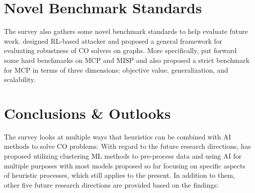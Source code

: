 \documentclass[a4paper]{article}
\begin{document}
\section{Novel Benchmark Standards}
The survey also gathers some novel benchmark standards to help evaluate future work. \citet{Lu} designed RL-based attacker and proposed a general framework for evaluating robustness of CO solvers on graphs. More specifically, \citet{Angelini} put forward some hard benchmarks on MCP and MISP and \citet{Ankur} also proposed a strict benchmark for MCP in terms of three dimensions: objective value, generalization, and scalability.

\section{Conclusions \& Outlooks}
The survey looks at multiple ways that heuristics can be combined with AI methods to solve CO problems. With regard to the future research directions, \citet{Maryam} has proposed utilizing clustering ML methods to pre-process data and using AI for multiple purposes with most models proposed so far focusing on specific aspects of heuristic processes, which still applies to the present. In addition to them, other five future research directions are provided based on the findings:
\end{document}
